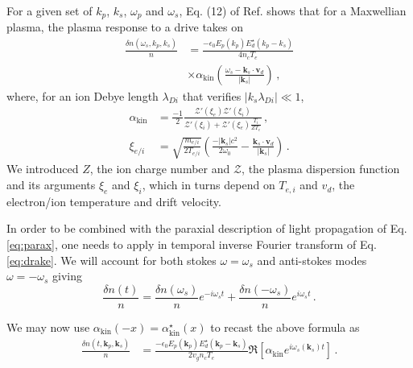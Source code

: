 \documentclass[
 reprint,
 amsmath,amssymb,
 aps,
]{revtex4-1}
\begin{document}
For a given set of $k_p$, $k_s$, $\omega_p$ and $\omega_s$, Eq. (12) of  Ref. \cite[]{POF_Drake_1973} shows that  for  a Maxwellian plasma, the plasma response to a drive  takes on 
\begin{align}
 \frac{ \delta n (\omega_s, k_p,k_s) }{n}  &=   \frac{ -\epsilon_0 E_p(k_p) E_d^\star(k_p-k_s) }{ 4 n_c T_e } \nonumber \\  &\times \alpha_\mathrm{kin}\left(\frac{\omega_s- \mathbf{k}_s\cdot \mathbf{v}_d}{\vert \mathbf{k}_s \vert }\right)   \, ,\label{eq:drake}
 \end{align}
 where, for an ion Debye length $\lambda_{Di}$ that verifies $\vert k_s \lambda_{Di} \vert \ll 1$, %
 \begin{align}
\alpha_\mathrm{kin} &=  \frac{-1}{2}\frac{ \mathcal{Z}'( \xi_e)\mathcal{Z}'( \xi_i)    }{   \mathcal{Z}'( \xi_i) + \mathcal{Z}'( \xi_e)\frac{  T_i }{ ZT_e } }    \, , \label{eq:drakea}\\
\xi_{e/i } &=  \sqrt{ \frac{ m_{e/i } }{ 2T_{e/i }}  } \left( \frac{ -\vert \mathbf{k}_s\vert c^2  }{  2\omega_0 }  - \frac{    \mathbf{k}_s \cdot \mathbf{v}_d }{  \vert \mathbf{k}_s\vert }\right)  \label{eq:xiie}   \,  .
\end{align}
We introduced $Z$, the ion charge number and  $ \mathcal{Z}$, the plasma dispersion function \cite{Fried_Gell-Mann_1960} and its arguments $\xi_{e } $ and $\xi_{i }$, which in turns depend on $T_{e,i}$ and $v_d$, the electron/ion temperature and  drift velocity.

In order to be combined with the paraxial description of light propagation of Eq. \eqref{eq:parax}, one needs to apply in temporal inverse Fourier transform of Eq. \eqref{eq:drake}. We will account for both stokes $\omega=\omega_s$ and anti-stokes modes $\omega=-\omega_s$ giving 
\begin{equation}\label{eq:sa}
     \frac{ \delta n (t) }{n}= \frac{ \delta n (\omega_s) }{n}e^{-i\omega_st} + \frac{ \delta n (-\omega_s) }{n}e^{i\omega_st}\, .
\end{equation}

We may now use $\alpha_\mathrm{kin}(-x) = \alpha^\star_\mathrm{kin}(x) $ to recast the above formula as 
\begin{align}
\frac{ \delta n (t,\mathbf{k}_p,\mathbf{k}_s ) }{n}  &=   \frac{ -\epsilon_0 E_p(\mathbf{k}_p) E_d^\star(\mathbf{k}_p-\mathbf{k}_s)  }{ 2 v_g n_c T_e } 
 \Re \left[ \alpha_\mathrm{kin}  e^{ i\omega_s(\mathbf{k}_s) t} \right]  \, .\label{eq:drakef}
\end{align}
\end{document}
